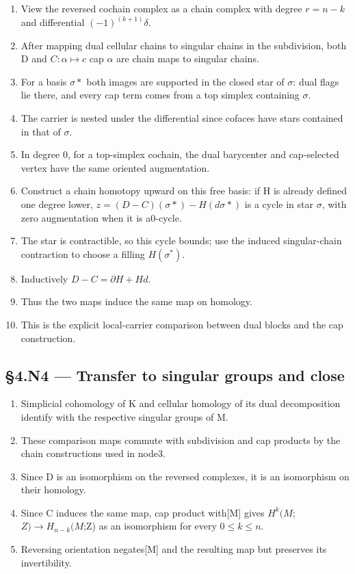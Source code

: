 \documentclass[preprint,12pt,aps,pra,showkeys,amsmath,amssymb,superscriptaddress,floatfix]{revtex4-2}
\theoremstyle{definition}
\theoremstyle{remark}
\begin{document}
\begin{enumerate}
\def\labelenumi{\arabic{enumi}.}
\item
  View the reversed cochain complex as a chain complex with degree
  \(r=n-k\) and differential \((-1)^{(k+1)}\delta\).
\item
  After mapping dual cellular chains to singular chains in the
  subdivision, both D and \(C:\alpha \mapsto c\) cap \(\alpha\) are
  chain maps to singular chains.
\item
  For a basis \(\sigma *\) both images are supported in the closed star
  of \(\sigma\): dual flags lie there, and every cap term comes from a
  top simplex containing \(\sigma\).
\item
  The carrier is nested under the differential since cofaces have stars
  contained in that of \(\sigma\).
\item
  In degree 0, for a top-simplex cochain, the dual barycenter and
  cap-selected vertex have the same oriented augmentation.
\item
  Construct a chain homotopy upward on this free basis: if H is already
  defined one degree lower, \(z=(D-C)(\sigma *)-H(d\sigma *)\) is a
  cycle in star \(\sigma\), with zero augmentation when it is a0-cycle.
\item
  The star is contractible, so this cycle bounds; use the induced
  singular-chain contraction to choose a filling \(H(\sigma^*)\).
\item
  Inductively \(D-C=\partial H+Hd\).
\item
  Thus the two maps induce the same map on homology.
\item
  This is the explicit local-carrier comparison between dual blocks and
  the cap construction.
\end{enumerate}

\subsection{§4.N4 --- Transfer to singular groups and
close}\label{n4-transfer-to-singular-groups-and-close}

\begin{enumerate}
\def\labelenumi{\arabic{enumi}.}
\item
  Simplicial cohomology of K and cellular homology of its dual
  decomposition identify with the respective singular groups of M.
\item
  These comparison maps commute with subdivision and cap products by the
  chain constructions used in node3.
\item
  Since D is an isomorphism on the reversed complexes, it is an
  isomorphism on their homology.
\item
  Since C induces the same map, cap product with{[}M{]} gives
  \(H^k(M\);\(Z)\to H_{n-k}(M\);Z) as an isomorphism for every
  \(0\le k\le n\).
\item
  Reversing orientation negates{[}M{]} and the resulting map but
  preserves its invertibility.
\end{enumerate}
\end{document}
